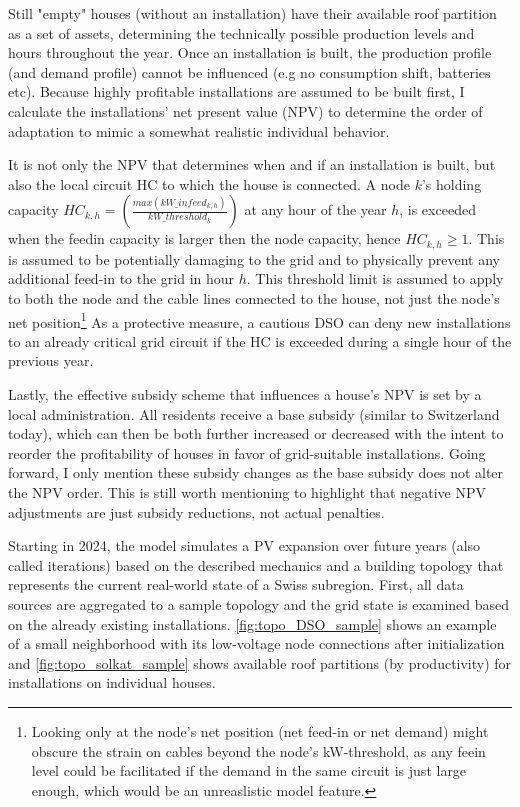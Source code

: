 \documentclass[12PT, ]{article}
\begin{document}
Still "empty" houses (without an installation) have their available roof partition as a set of assets, determining the technically possible production levels and hours throughout the year. Once an installation is built, the production profile (and demand profile) cannot be influenced (e.g no consumption shift, batteries etc).
Because highly profitable installations are assumed to be built first, I calculate the installations' net present value (NPV) to determine the order of adaptation to mimic a somewhat realistic individual behavior. 

It is not only the NPV that determines when and if an installation is built, but also the local circuit HC to which the house is connected.
A node $k$'s holding capacity $HC_{k,h} = \left( \frac{max(kW\_infeed_{k,h})}{kW\_threshold_k} \right)$ at any hour of the year $h$, is exceeded when the feedin capacity is larger then the node capacity, hence $HC_{k,h} \geq 1$. This is assumed to be potentially damaging to the grid and to physically prevent any additional feed-in to the grid in hour $h$. 
This threshold limit is assumed to apply to both the node and the cable lines connected to the house, not just the node's net position\footnote{Looking only at the node's net position (net feed-in or net demand) might obscure the strain on cables beyond the node's kW-threshold, as any feein level could be facilitated if the demand in the same circuit is just large enough, which would be an unreaslistic model feature.}
As a protective measure, a cautious DSO can deny new installations to an already critical grid circuit if the HC is exceeded during a single hour of the previous year.

Lastly, the effective subsidy scheme that influences a house's NPV is set by a local administration. All residents receive a base subsidy (similar to Switzerland today), which can then be both further increased or decreased with the intent to reorder the profitability of houses in favor of grid-suitable installations. Going forward, I only mention these subsidy changes as the base subsidy does not alter the NPV order. This is still worth mentioning to highlight that negative NPV adjustments are just subsidy reductions, not actual penalties.  

Starting in 2024, the model simulates a PV expansion over future years (also called iterations) based on the described mechanics and a building topology that represents the current real-world state of a Swiss subregion. 
First, all data sources are aggregated to a sample topology and the grid state is examined based on the already existing installations. 
\ref{fig:topo_DSO_sample} shows an example of a small neighborhood with its low-voltage node connections after initialization and \ref{fig:topo_solkat_sample} shows available roof partitions (by productivity) for installations on individual houses.
\end{document}
